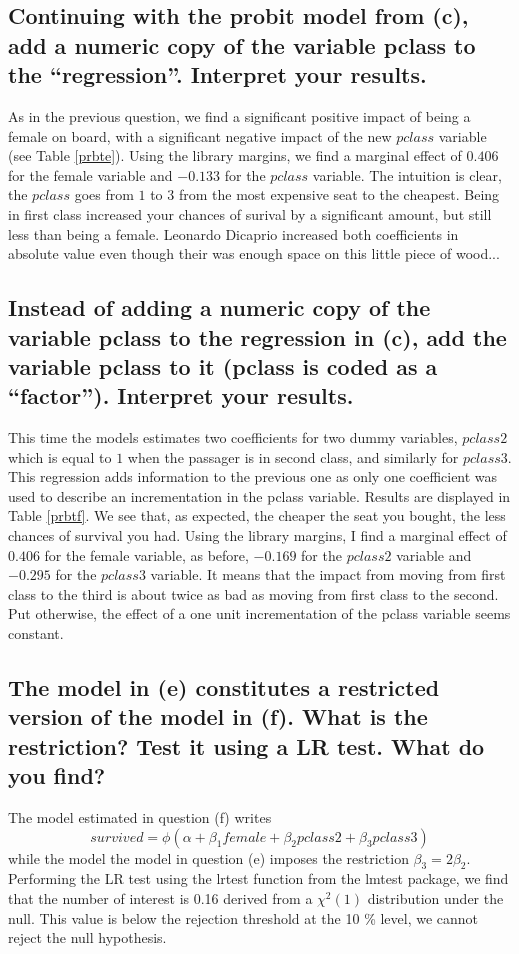 \documentclass[12pt]{article}
\begin{document}
\subsection{Continuing with the probit model from (c), add a numeric copy of the variable pclass to the “regression”. Interpret your results.}
As in the previous question, we find a significant positive impact of being a female on board, with a significant negative impact of the new $pclass$ variable (see Table \ref{prbte}). Using the library margins, we find a marginal effect of $0.406$ for the female variable and $-0.133$ for the $pclass$ variable. The intuition is clear, the $pclass$ goes from $1$ to $3$ from the most expensive seat to the cheapest. Being in first class increased your chances of surival by a significant amount, but still less than being a female. Leonardo Dicaprio increased both coefficients in absolute value even though their was enough space on this little piece of wood...


\subsection{Instead of adding a numeric copy of the variable pclass to the regression in (c), add the variable pclass to it (pclass is coded as a “factor”). Interpret your results.}
This time the models estimates two coefficients for two dummy variables, $pclass2$ which is equal to $1$ when the passager is in second class, and similarly for $pclass3$. This regression adds information to the previous one as only one coefficient was used to describe an incrementation in the pclass variable. Results are displayed in Table \ref{prbtf}. We see that, as expected, the cheaper the seat you bought, the less chances of survival you had. Using the library margins, I find a marginal effect of $0.406$ for the female variable, as before, $-0.169$ for the $pclass2$ variable and $-0.295$ for the $pclass3$ variable. It means that the impact from moving from first class to the third is about twice as bad as moving from first class to the second. Put otherwise, the effect of a one unit incrementation of the pclass variable seems constant.


\subsection{The model in (e) constitutes a restricted version of the model in (f). What is the restriction? Test it using a LR test. What do you find?}
The model estimated in question (f) writes
$$survived = \phi(\alpha + \beta_1 female + \beta_2 pclass2 + \beta_3 pclass 3)$$
while the model the model in question (e) imposes the restriction $\beta_3 = 2 \beta_2$.
Performing the LR test using the lrtest function from the lmtest package, we find that the number of interest is 0.16 derived from a $\chi^2(1)$ distribution under the null. This value is below the rejection threshold at the 10 \% level, we cannot reject the null hypothesis.
\end{document}
